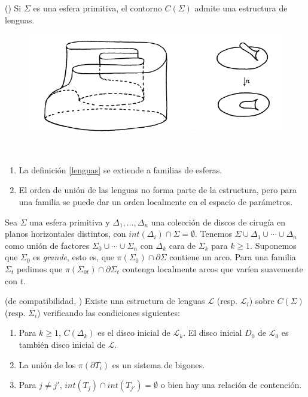 \documentclass[twoside, 11pt]{article}
\begin{document}
\begin{teorema}(\cite[3.3]{Bo})
Si $\Sigma$ es una esfera primitiva, el contorno $C(\Sigma)$ admite una estructura de lenguas. 
\end{teorema}

\begin{figure}[h!]
\includegraphics[scale=0.6]{contour}
\end{figure}

\begin{nota}\
\begin{enumerate}
\item La definición \ref{lenguas} se extiende a familias de esferas.
\item El orden de unión de las lenguas no forma parte de la estructura, pero para una familia se puede dar un orden localmente en el espacio de parámetros.  
\end{enumerate}
\end{nota}

Sea $\Sigma$ una esfera primitiva y $\Delta_1,\dots, \Delta_n$ una colección de discos de cirugía en planos horizontales distintos, con $int(\Delta_i)\cap\Sigma=\emptyset$. Tenemos $\Sigma\cup\Delta_1\cup\cdots\cup\Delta_n$ como unión de factores $\Sigma_0\cup\cdots\cup \Sigma_n$ con $\Delta_k$ cara de $\Sigma_k$ para $k\geq 1$. Suponemos que $\Sigma_0$ es \emph{grande}, esto es, que $\pi(\Sigma_0)\cap\partial\Sigma$ contiene un arco. Para una familia $\Sigma_t$ pedimos que $\pi(\Sigma_{0t})\cap\partial\Sigma_t$ contenga localmente arcos que varíen suavemente con $t$.

\begin{teorema}(de compatibilidad, \cite[Proposición 5.2]{Ha})
Existe una estructura de lenguas $\mathcal{L}$ (resp. $\mathcal{L}_i$) sobre $C(\Sigma)$ (resp. $\Sigma_i$) verificando las condiciones siguientes:
\begin{enumerate}
\item Para $k\geq 1$, $C(\Delta_k)$ es el disco inicial de $\mathcal{L}_k$. El disco inicial $D_0$ de $\mathcal{L}_0$ es también disco inicial de $\mathcal{L}$.
\item La unión de los $\pi(\partial T_i)$ es un sistema de bigones.
\item Para $j\neq j'$, $int(T_j)\cap int(T_{j'})=\emptyset$ o bien hay una relación de contención. 
\end{enumerate}
\end{teorema}
\end{document}
